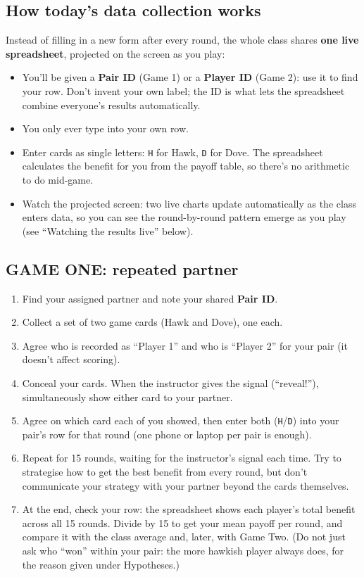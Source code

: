 \documentclass[
  a4paper]{book}
\providecommand{\tightlist}{%
  \setlength{\itemsep}{0pt}\setlength{\parskip}{0pt}}
\begin{document}
\subsection{How today's data collection works}\label{how-todays-data-collection-works}

Instead of filling in a new form after every round, the whole class shares \textbf{one live spreadsheet}, projected on the screen as you play:

\begin{itemize}
\tightlist
\item
  You'll be given a \textbf{Pair ID} (Game 1) or a \textbf{Player ID} (Game 2): use it to find your row. Don't invent your own label; the ID is what lets the spreadsheet combine everyone's results automatically.
\item
  You only ever type into your own row.
\item
  Enter cards as single letters: \texttt{H} for Hawk, \texttt{D} for Dove. The spreadsheet calculates the benefit for you from the payoff table, so there's no arithmetic to do mid-game.
\item
  Watch the projected screen: two live charts update automatically as the class enters data, so you can see the round-by-round pattern emerge as you play (see ``Watching the results live'' below).
\end{itemize}

\subsection{GAME ONE: repeated partner}\label{game-one-repeated-partner}

\begin{enumerate}
\def\labelenumi{\arabic{enumi}.}
\tightlist
\item
  Find your assigned partner and note your shared \textbf{Pair ID}.
\item
  Collect a set of two game cards (Hawk and Dove), one each.
\item
  Agree who is recorded as ``Player 1'' and who is ``Player 2'' for your pair (it doesn't affect scoring).
\item
  Conceal your cards. When the instructor gives the signal (``reveal!''), simultaneously show either card to your partner.
\item
  Agree on which card each of you showed, then enter both (\texttt{H}/\texttt{D}) into your pair's row for that round (one phone or laptop per pair is enough).
\item
  Repeat for 15 rounds, waiting for the instructor's signal each time. Try to strategise how to get the best benefit from every round, but don't communicate your strategy with your partner beyond the cards themselves.
\item
  At the end, check your row: the spreadsheet shows each player's total benefit across all 15 rounds. Divide by 15 to get your mean payoff per round, and compare it with the class average and, later, with Game Two. (Do not just ask who ``won'' within your pair: the more hawkish player always does, for the reason given under Hypotheses.)
\end{enumerate}
\end{document}
